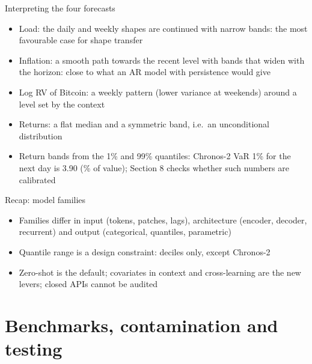 \begin{frame}{Interpreting the four forecasts}
\itemsize{\small}
\begin{itemize}
    \item Load: the daily and weekly shapes are continued with narrow bands: the most favourable case for shape transfer
    \item Inflation: a smooth path towards the recent level with bands that widen with the horizon: close to what an AR model with persistence would give
    \item Log RV of Bitcoin: a weekly pattern (lower variance at weekends) around a level set by the context
    \item Returns: a flat median and a symmetric band, i.e.\ an unconditional distribution
    \item Return bands from the 1\% and 99\% quantiles: Chronos-2 VaR 1\% for the next day is 3.90 (\% of value); Section 8 checks whether such numbers are calibrated
\end{itemize}
\end{frame}

\begin{frame}{Recap: model families}
\itemsize{\small}
\begin{itemize}
    \item Families differ in input (tokens, patches, lags), architecture (encoder, decoder, recurrent) and output (categorical, quantiles, parametric)
    \item Quantile range is a design constraint: deciles only, except Chronos-2
    \item Zero-shot is the default; covariates in context and cross-learning are the new levers; closed APIs cannot be audited
\end{itemize}
\end{frame}


\section{Benchmarks, contamination and testing}

